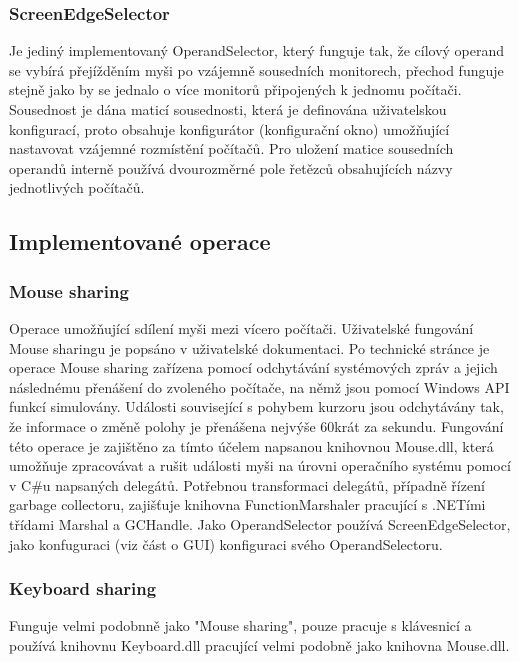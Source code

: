 \documentclass[12pt]{article}
\begin{document}
\subsubsection{ScreenEdgeSelector}
Je jediný implementovaný OperandSelector, který funguje tak, že cílový operand se vybírá přejížděním myši po vzájemně sousedních monitorech, přechod funguje stejně jako by se jednalo o více monitorů připojených k jednomu počítači. Sousednost je dána maticí sousednosti, která je definována uživatelskou konfigurací, proto obsahuje konfigurátor (konfigurační okno) umožňující nastavovat vzájemné rozmístění počítačů. Pro uložení matice sousedních operandů interně používá dvourozměrné pole řetězců obsahujících názvy jednotlivých počítačů.

\subsection{Implementované operace}
\subsubsection{Mouse sharing}
Operace umožňující sdílení myši mezi vícero počítači. Uživatelské fungování Mouse sharingu je popsáno v uživatelské dokumentaci. Po technické stránce je operace Mouse sharing zařízena pomocí odchytávání systémových zpráv a jejich následnému přenášení do zvoleného počítače, na němž jsou pomocí Windows API funkcí simulovány. Události související s pohybem kurzoru jsou odchytávány tak, že informace o změně polohy je přenášena nejvýše 60krát za sekundu. Fungování této operace je zajištěno za tímto účelem napsanou knihovnou Mouse.dll, která umožňuje zpracovávat a rušit události myši na úrovni operačního systému pomocí v C\#u napsaných delegátů. Potřebnou transformaci delegátů, případně řízení garbage collectoru, zajišťuje knihovna FunctionMarshaler pracující s .NETími třídami Marshal a GCHandle. Jako OperandSelector používá ScreenEdgeSelector, jako konfuguraci (viz část o GUI) konfiguraci svého OperandSelectoru.

\subsubsection{Keyboard sharing}
Funguje velmi podobnně jako "Mouse sharing", pouze pracuje s klávesnicí a používá knihovnu Keyboard.dll pracující velmi podobně jako knihovna Mouse.dll.
\end{document}
